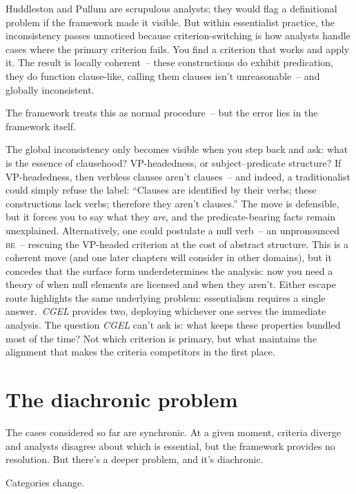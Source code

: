 Huddleston and Pullum are scrupulous analysts; they would flag a definitional problem if the framework made it visible. But within essentialist practice, the inconsistency passes unnoticed because criterion-switching is how analysts handle cases where the primary criterion fails. You find a criterion that works and apply it. The result is locally coherent~-- these constructions do exhibit predication, they do function clause-like, calling them clauses isn't unreasonable~-- and globally inconsistent.

The framework treats this as normal procedure~-- but the error lies in the framework itself.

The global inconsistency only becomes visible when you step back and ask: what is the essence of clausehood? VP-headedness, or subject--predicate structure? If VP-headedness, then verbless clauses aren't clauses~-- and indeed, a traditionalist could simply refuse the label: \enquote{Clauses are identified by their verbs; these constructions lack verbs; therefore they aren't clauses.} The move is defensible, but it forces you to say what they \emph{are}, and the predicate-bearing facts remain unexplained. Alternatively, one could postulate a null verb~-- an unpronounced \textsc{be}~-- rescuing the VP-headed criterion at the cost of abstract structure. This is a coherent move (and one later chapters will consider in other domains), but it concedes that the surface form underdetermines the analysis: now you need a theory of when null elements are licensed and when they aren't. Either escape route highlights the same underlying problem: essentialism requires a single answer.\ \textit{CGEL} provides two, deploying whichever one serves the immediate analysis. The question \textit{CGEL} can't ask is: what keeps these properties bundled most of the time? Not which criterion is primary, but what maintains the alignment that makes the criteria competitors in the first place.

\section{The diachronic problem}
\label{sec:2:diachronic-problem}

The cases considered so far are synchronic. At a given moment, criteria diverge and analysts disagree about which is essential, but the framework provides no resolution. But there's a deeper problem, and it's diachronic.

Categories change.

